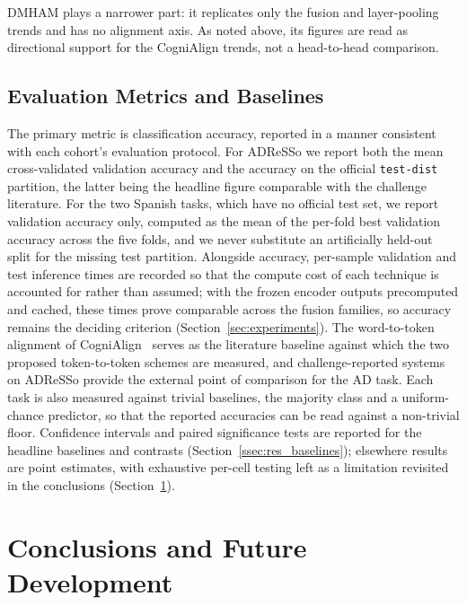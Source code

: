 \documentclass[a4paper,12pt]{article}
\begin{document}
DMHAM plays a narrower part: it replicates only the fusion and layer-pooling trends and has no alignment axis. As noted above, its figures are read as directional support for the CogniAlign trends, not a head-to-head comparison.

\subsection{Evaluation Metrics and Baselines}
\label{ssec:evaluation}

The primary metric is classification accuracy, reported in a manner consistent with each cohort's evaluation protocol. For ADReSSo we report both the mean cross-validated validation accuracy and the accuracy on the official \texttt{test-dist} partition, the latter being the headline figure comparable with the challenge literature. For the two Spanish tasks, which have no official test set, we report validation accuracy only, computed as the mean of the per-fold best validation accuracy across the five folds, and we never substitute an artificially held-out split for the missing test partition. Alongside accuracy, per-sample validation and test inference times are recorded so that the compute cost of each technique is accounted for rather than assumed; with the frozen encoder outputs precomputed and cached, these times prove comparable across the fusion families, so accuracy remains the deciding criterion (Section~\ref{sec:experiments}). The word-to-token alignment of CogniAlign~\cite{ortiz2025cognialign} serves as the literature baseline against which the two proposed token-to-token schemes are measured, and challenge-reported systems on ADReSSo provide the external point of comparison for the AD task. Each task is also measured against trivial baselines, the majority class and a uniform-chance predictor, so that the reported accuracies can be read against a non-trivial floor. Confidence intervals and paired significance tests are reported for the headline baselines and contrasts (Section~\ref{ssec:res_baselines}); elsewhere results are point estimates, with exhaustive per-cell testing left as a limitation revisited in the conclusions (Section~\ref{sec:conclusions}).



\clearpage
\section{Conclusions and Future Development}
\label{sec:conclusions}
\end{document}
